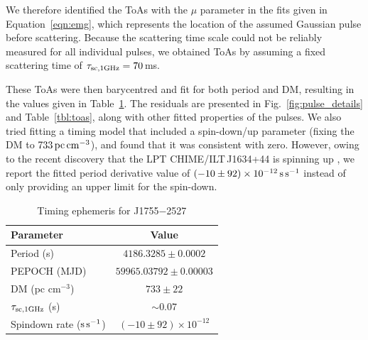 \documentclass[fleqn,usenatbib]{mnras}
\newcommand{\revision}[2]{{\color{red}#2}}
\newcommand{\src}{J1755$-$2527}
\newcommand{\Fig}{Fig.}
\newcommand{\Tab}{Table}
\newcommand{\Eqn}{Equation}
\begin{document}
We therefore identified the ToAs with the $\mu$ parameter in the fits given in \Eqn~\ref{eqn:emg}, which represents the location of the assumed Gaussian pulse before scattering.
Because the scattering time scale could not be reliably measured for all individual pulses, we obtained ToAs by assuming a fixed scattering time of $\tau_{\rm sc,1 GHz} = 70$\,ms.

These ToAs were then barycentred and fit for both period and DM, resulting in the values given in \Tab~\ref{tbl:ephemeris}.
The residuals are presented in \Fig~\ref{fig:pulse_details} and \Tab~\ref{tbl:toas}, along with other fitted properties of the pulses.
\revision{We also tried fitting a timing model that included a spin-down parameter, and found that it was consistent with zero spin-down to within $1\sigma$, and so is not included in the ephemeris.}{We also tried fitting a timing model that included a spin-down/up parameter (fixing the DM to $733\,{\rm pc}\,{\rm cm}^{-3}$), and found that it was consistent with zero.
However, owing to the recent discovery that the LPT CHIME/ILT\,J1634+44 is spinning up \citep[$\dot{P} = (-9.03 \pm 0.11) \times 10^{-12}\,{\rm s}\,{\rm s}^{-1}$;][]{2025arXiv250705139D,2025arXiv250705078B}, we report the fitted period derivative value of $(-10 \pm 92) \times 10^{-12}\,{\rm s}\,{\rm s}^{-1}$ instead of only providing an upper limit for the spin-down.}

\begin{table}
  \centering
  \caption{Timing ephemeris for \src{}}
  \label{tbl:ephemeris}
  \begin{tabular}{lc}
    \hline
    Parameter & Value \\
    \hline
    Period (s) & $4186.3285 \pm 0.0002$ \\
    PEPOCH (MJD) & $59965.03792 \pm 0.00003$ \\
    DM (pc cm$^{-3}$) & $733 \pm 22$ \\
    $\tau_{\rm sc,1 GHz}$ (s) & ${\sim}0.07$ \\
    \revision{}{Spindown rate (${\rm s}\,{\rm s}^{-1}$)} & \revision{}{$(-10 \pm 92) \times 10^{-12}$} \\
    \hline
  \end{tabular}
\end{table}
\end{document}
